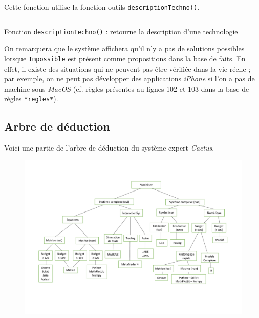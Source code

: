 \documentclass[a4paper,12pt]{article}
\begin{document}
Cette fonction utilise la fonction outils \texttt{descriptionTechno()}.


\begin{listing}[H]
	\centering
	\inputminted[breaklines=true,linenos,firstline=12]{lisp}{../afficherPropositions.lisp}
	\caption{Fonction \texttt{descriptionTechno()} : retourne la description d'une technologie}
\end{listing}


On remarquera que le système affichera qu'il n'y a pas de solutions possibles lorsque \texttt{Impossible} est présent comme propositions dans la base de faits. En effet, il existe des situations qui ne peuvent pas être vérifiée dans la vie réelle ; par exemple, on ne peut pas développer des applications \textit{iPhone} si l'on a pas de machine sous \textit{MacOS} (cf. règles présentes au lignes 102 et 103 dans la base de règles \texttt{*regles*}).

\newpage
	\subsection{Arbre de déduction}
	
	Voici une partie de l'arbre de déduction du système expert \textit{Cactus}.
	\begin{figure}[H]
		\centering
		\includegraphics[scale=0.5]{graph_deduction.pdf}
	\end{figure}
	
\end{document}
